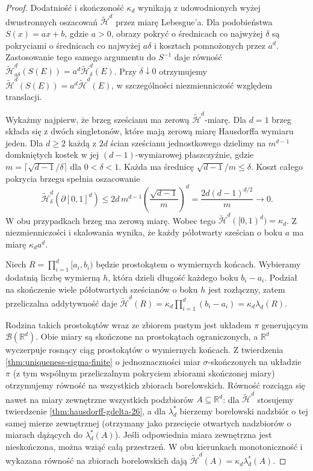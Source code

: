 \begin{proof}
Dodatniość i skończoność $\kappa_d$ wynikają z
udowodnionych wyżej dwustronnych oszacowań
$\widetilde{\mathcal H}^{d}$ przez miarę Lebesgue'a.
Dla podobieństwa $S(x)=ax+b$, gdzie $a>0$,
obrazy pokryć o średnicach co najwyżej $\delta$
są pokryciami o średnicach co najwyżej $a\delta$
i kosztach pomnożonych przez $a^d$.
Zastosowanie tego samego argumentu do $S^{-1}$
daje równość
$\widetilde{\mathcal H}^{d}_{a\delta}(S(E))
=a^d\widetilde{\mathcal H}^{d}_\delta(E)$.
Przy $\delta\downarrow0$ otrzymujemy
$\widetilde{\mathcal H}^{d}(S(E))
=a^d\widetilde{\mathcal H}^{d}(E)$,
w szczególności niezmienniczość względem translacji.

Wykażmy najpierw, że brzeg sześcianu ma zerową
$\widetilde{\mathcal H}^{d}$-miarę.
Dla $d=1$ brzeg składa się z dwóch singletonów,
które mają zerową miarę Hausdorffa wymiaru jeden.
Dla $d\ge2$ każdą z $2d$ ścian sześcianu jednostkowego
dzielimy na $m^{d-1}$ domkniętych kostek w jej
$(d-1)$-wymiarowej płaszczyźnie, gdzie
$m=\lceil\sqrt{d-1}/\delta\rceil$ dla $0<\delta<1$.
Każda ma średnicę $\sqrt{d-1}/m\le\delta$.
Koszt całego pokrycia brzegu spełnia oszacowanie
\[
 \widetilde{\mathcal H}^{d}_\delta(\partial[0,1]^d)
 \le 2d\,m^{d-1}
          \left(\frac{\sqrt{d-1}}m\right)^d
 =\frac{2d(d-1)^{d/2}}m\longrightarrow0.
\]
W obu przypadkach brzeg ma zerową miarę. Wobec tego
$\widetilde{\mathcal H}^{d}([0,1)^d)=\kappa_d$.
Z niezmienniczości i skalowania wynika, że każdy
półotwarty sześcian o boku $a$ ma miarę
$\kappa_da^d$.

Niech $R=\prod_{i=1}^d[a_i,b_i)$ będzie
prostokątem o wymiernych końcach.
Wybieramy dodatnią liczbę wymierną $h$, która
dzieli długość każdego boku $b_i-a_i$.
Podział na skończenie wiele półotwartych sześcianów
o boku $h$ jest rozłączny, zatem przeliczalna
addytywność daje
$\widetilde{\mathcal H}^{d}(R)
=\kappa_d\prod_{i=1}^d(b_i-a_i)
=\kappa_d\lambda_d(R)$.

Rodzina takich prostokątów wraz ze zbiorem pustym
jest układem $\pi$ generującym $\mathcal B(\mathbb R^d)$.
Obie miary są skończone na prostokątach ograniczonych,
a $\mathbb R^d$ wyczerpuje rosnący ciąg prostokątów
o wymiernych końcach. Z twierdzenia \ref{thm:uniqueness-sigma-finite}
o jednoznaczności miar $\sigma$-skończonych na układzie
$\pi$ (z tym wspólnym przeliczalnym pokryciem zbiorami
skończonej miary) otrzymujemy równość na wszystkich
zbiorach borelowskich.
Równość rozciąga się nawet na miary zewnętrzne wszystkich
podzbiorów $A\subseteq\mathbb R^d$:
dla $\widetilde{\mathcal H}^d$ stosujemy twierdzenie
\ref{thm:hausdorff-gdelta-26}, a dla $\lambda_d^*$
bierzemy borelowski nadzbiór o tej samej mierze zewnętrznej
(otrzymany jako przecięcie otwartych nadzbiorów
o miarach dążących do $\lambda_d^*(A)$).
Jeśli odpowiednia miara zewnętrzna jest nieskończona,
można wziąć całą przestrzeń. W obu kierunkach
monotoniczność i wykazana równość na zbiorach
borelowskich dają
$\widetilde{\mathcal H}^d(A)=\kappa_d\lambda_d^*(A)$.
\end{proof}


